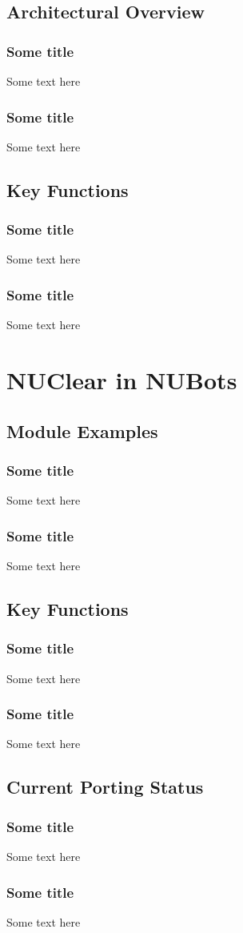 \documentclass{beamer}
\begin{document}
\subsection{Architectural Overview}
	\begin{frame}
		\frametitle{Some title}
		Some text here
	\end{frame}
	
	\begin{frame}
		\frametitle{Some title}
		Some text here
	\end{frame}

\subsection{Key Functions}
	\begin{frame}
		\frametitle{Some title}
		Some text here
	\end{frame}
	
	\begin{frame}
		\frametitle{Some title}
		Some text here
	\end{frame}

\section{NUClear in NUBots}
\subsection{Module Examples}
	\begin{frame}
		\frametitle{Some title}
		Some text here
	\end{frame}
	
	\begin{frame}
		\frametitle{Some title}
		Some text here
	\end{frame}

\subsection{Key Functions}
	\begin{frame}
		\frametitle{Some title}
		Some text here
	\end{frame}
	
	\begin{frame}
		\frametitle{Some title}
		Some text here
	\end{frame}
	
\subsection{Current Porting Status}
	\begin{frame}
		\frametitle{Some title}
		Some text here
	\end{frame}
	
	\begin{frame}
		\frametitle{Some title}
		Some text here
	\end{frame}
\end{document}
